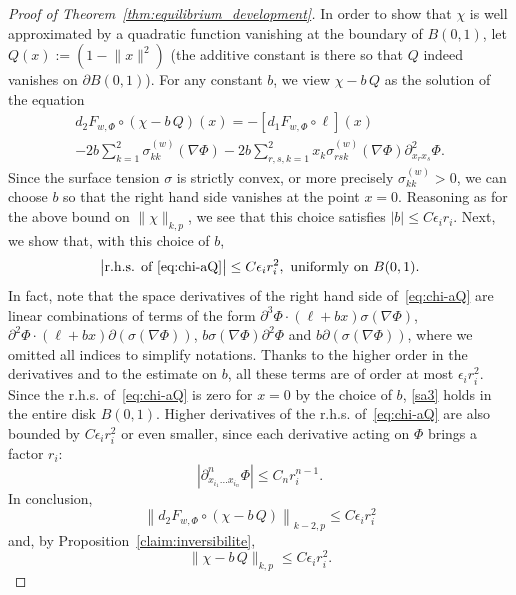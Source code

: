 \documentclass[10pt]{amsart}
\theoremstyle{definition}\newtheorem{defi}[theo]{Definition}\newtheorem{rema}[theo]{Remark}\newtheorem{exam}[theo]{Example}\newtheorem{exem}[theo]{Example}\newtheorem{nota}[theo]{Notation}
\newcommand{\norm}[1]{\lVert #1 \rVert}
\newcommand{\abs}[1]{\lvert #1 \rvert}
\newcommand{\eps}{\epsilon}
\begin{document}
\begin{proof}[Proof of Theorem~\ref{thm:equilibrium_development}]
In order to show that $\chi$ is well approximated by a quadratic function vanishing at the boundary of $B(0,1)$, let $Q(x) := (1 -
\norm{x}^2)$ (the additive constant is there so that $Q$ indeed vanishes on $\partial B(0,1)$). For any constant $b$, we view $\chi - b\, Q$ as the solution of the equation
\begin{multline}\label{eq:chi-aQ}
d_2 F_{w,\Phi}\circ(\chi - b\, Q)(x) = -\left[d_1 F_{w,\Phi}\circ \ell\right](x)
\\ -2b\sum_{k=1}^2\sigma^{(w)}_{kk}(\nabla\Phi) - 2b\sum_{r,s,k=1}^2x_k\sigma^{(w)}_{rsk}(\nabla\Phi)\partial^2_{x_r x_s} \Phi.
\end{multline}
Since the surface tension $\sigma$ is strictly convex, or more precisely $\sigma^{(w)}_{kk}>0$, we can choose $b$ so that the right hand side vanishes at the point $x=0$. Reasoning as for the above bound on $\norm{\chi}_{k,p}$, we see that this choice satisfies $\abs{b}
\leq C\epsilon_ir_i$. Next, we show that, with this choice of $b$,
\begin{equation}\label{sa3}
\text{\big|r.h.s. of~\eqref{eq:chi-aQ}}\big|\le C\epsilon_i r_i^2,
\text{ uniformly on } B(0,1).
\end{equation}
In fact, note that the space derivatives of the right hand side of~\eqref{eq:chi-aQ} are linear combinations of terms of the form $\partial^3 \Phi\cdot (\ell + b x)
\sigma(\nabla \Phi)$, $\partial^2 \Phi \cdot (\ell + b x)
\partial(\sigma(\nabla \Phi))$, $b\sigma(\nabla\Phi)\partial^2\Phi$ and $b\partial (\sigma(\nabla \Phi))$, where we omitted all indices to simplify notations. Thanks to the higher order in the derivatives and to the estimate on $b$, all these terms are of order at most $\eps_i r_i^2$. Since the r.h.s. of~\eqref{eq:chi-aQ} is zero for $x=0$ by the choice of $b$, \eqref{sa3} holds in the entire disk $B(0,1)$. Higher derivatives of the r.h.s. of~\eqref{eq:chi-aQ} are also bounded by $C \epsilon_i r_i^2$ or even smaller, since each derivative acting on $\Phi$ brings a factor $r_i$:
\begin{equation}\label{higherderiv}
\left|\partial^{n}_{x_{i_1}\dots x_{i_n}}\Phi\right|\le C_n r_i^{n-1}.
\end{equation}
In conclusion,
\begin{equation}
\left\| d_2 F_{w,\Phi}\circ(\chi - b\,Q)\right\|_{k-2,p}\le C \epsilon_i r_i^2
\end{equation}
and, by Proposition~\ref{claim:inversibilite},
\begin{equation}\label{frigo}
\|\chi - b\,Q\|_{k,p}\le C \epsilon_i r_i^2.
\end{equation}


\end{proof}
\end{document}
